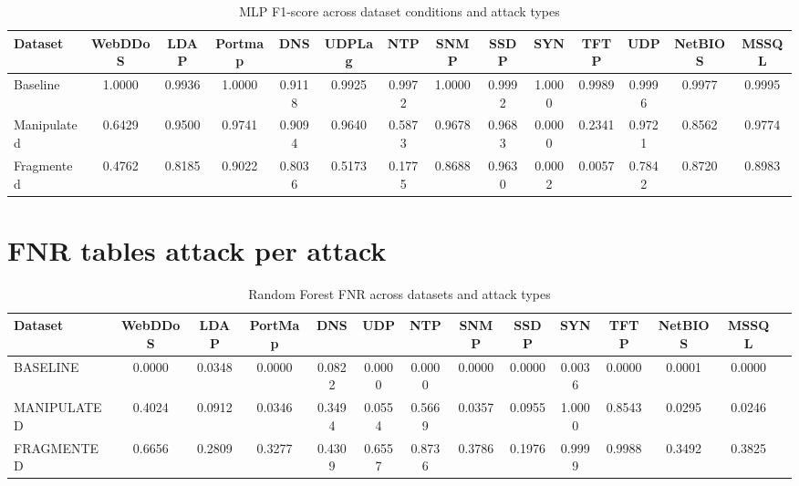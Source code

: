 \begin{table}[htbp]
\centering
\scriptsize
\setlength{\tabcolsep}{3pt}
\begin{tabular}{l|ccccccccccccc}
\hline
Dataset &
WebDDoS &
LDAP &
Portmap &
DNS &
UDPLag &
NTP &
SNMP &
SSDP &
SYN &
TFTP &
UDP &
NetBIOS &
MSSQL \\
\hline
Baseline &
1.0000 & 0.9936 & 1.0000 & 0.9118 & 0.9925 & 0.9972 & 1.0000 & 0.9992 & 1.0000 & 0.9989 & 0.9996 & 0.9977 & 0.9995 \\
\hline
Manipulated &
0.6429 & 0.9500 & 0.9741 & 0.9094 & 0.9640 & 0.5873 & 0.9678 & 0.9683 & 0.0000 & 0.2341 & 0.9721 & 0.8562 & 0.9774 \\
\hline
Fragmented &
0.4762 & 0.8185 & 0.9022 & 0.8036 & 0.5173 & 0.1775 & 0.8688 & 0.9630 & 0.0002 & 0.0057 & 0.7842 & 0.8720 & 0.8983 \\
\hline
\end{tabular}
\caption{MLP F1-score across dataset conditions and attack types}
\label{tab:mlp_f1}
\end{table}

\clearpage
\section{FNR tables attack per attack}

\begin{table}[htbp]
\centering
\scriptsize
\setlength{\tabcolsep}{3pt}
\begin{tabular}{l|ccccccccccccc}
\hline
Dataset &
WebDDoS &
LDAP &
PortMap &
DNS &
UDP &
NTP &
SNMP &
SSDP &
SYN &
TFTP &
NetBIOS &
MSSQL \\
\hline
BASELINE &
0.0000 &
0.0348 &
0.0000 &
0.0822 &
0.0000 &
0.0000 &
0.0000 &
0.0000 &
0.0036 &
0.0000 &
0.0001 &
0.0000 \\
\hline
MANIPULATED &
0.4024 &
0.0912 &
0.0346 &
0.3494 &
0.0554 &
0.5669 &
0.0357 &
0.0955 &
1.0000 &
0.8543 &
0.0295 &
0.0246 \\
\hline
FRAGMENTED &
0.6656 &
0.2809 &
0.3277 &
0.4309 &
0.6557 &
0.8736 &
0.3786 &
0.1976 &
0.9999 &
0.9988 &
0.3492 &
0.3825 \\
\hline
\end{tabular}
\caption{Random Forest FNR across datasets and attack types}
\label{tab:rf_fnr}
\end{table}

